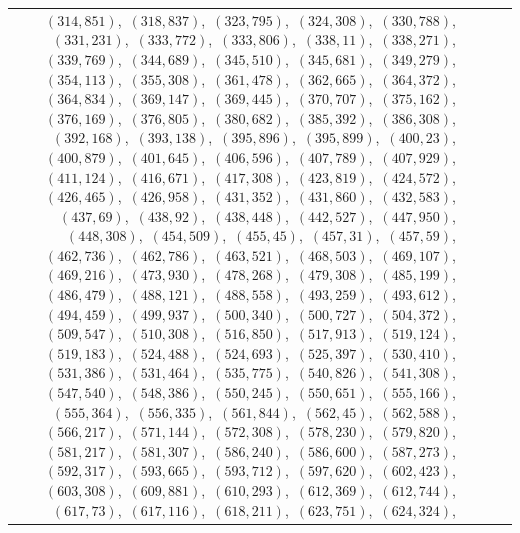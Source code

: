 \documentclass[11pt]{article}
\begin{document}
\begin{longtable}{@{}rrl>{\raggedright\arraybackslash}p{}@{}}
$(314,851)$,\allowbreak\ $(318,837)$,\allowbreak\ $(323,795)$,\allowbreak\ $(324,308)$,\allowbreak\ $(330,788)$,\allowbreak\ $(331,231)$,\allowbreak\ $(333,772)$,\allowbreak\ $(333,806)$,\allowbreak\ $(338,11)$,\allowbreak\ $(338,271)$,\allowbreak\ $(339,769)$,\allowbreak\ $(344,689)$,\allowbreak\ $(345,510)$,\allowbreak\ $(345,681)$,\allowbreak\ $(349,279)$,\allowbreak\ $(354,113)$,\allowbreak\ $(355,308)$,\allowbreak\ $(361,478)$,\allowbreak\ $(362,665)$,\allowbreak\ $(364,372)$,\allowbreak\ $(364,834)$,\allowbreak\ $(369,147)$,\allowbreak\ $(369,445)$,\allowbreak\ $(370,707)$,\allowbreak\ $(375,162)$,\allowbreak\ $(376,169)$,\allowbreak\ $(376,805)$,\allowbreak\ $(380,682)$,\allowbreak\ $(385,392)$,\allowbreak\ $(386,308)$,\allowbreak\ $(392,168)$,\allowbreak\ $(393,138)$,\allowbreak\ $(395,896)$,\allowbreak\ $(395,899)$,\allowbreak\ $(400,23)$,\allowbreak\ $(400,879)$,\allowbreak\ $(401,645)$,\allowbreak\ $(406,596)$,\allowbreak\ $(407,789)$,\allowbreak\ $(407,929)$,\allowbreak\ $(411,124)$,\allowbreak\ $(416,671)$,\allowbreak\ $(417,308)$,\allowbreak\ $(423,819)$,\allowbreak\ $(424,572)$,\allowbreak\ $(426,465)$,\allowbreak\ $(426,958)$,\allowbreak\ $(431,352)$,\allowbreak\ $(431,860)$,\allowbreak\ $(432,583)$,\allowbreak\ $(437,69)$,\allowbreak\ $(438,92)$,\allowbreak\ $(438,448)$,\allowbreak\ $(442,527)$,\allowbreak\ $(447,950)$,\allowbreak\ $(448,308)$,\allowbreak\ $(454,509)$,\allowbreak\ $(455,45)$,\allowbreak\ $(457,31)$,\allowbreak\ $(457,59)$,\allowbreak\ $(462,736)$,\allowbreak\ $(462,786)$,\allowbreak\ $(463,521)$,\allowbreak\ $(468,503)$,\allowbreak\ $(469,107)$,\allowbreak\ $(469,216)$,\allowbreak\ $(473,930)$,\allowbreak\ $(478,268)$,\allowbreak\ $(479,308)$,\allowbreak\ $(485,199)$,\allowbreak\ $(486,479)$,\allowbreak\ $(488,121)$,\allowbreak\ $(488,558)$,\allowbreak\ $(493,259)$,\allowbreak\ $(493,612)$,\allowbreak\ $(494,459)$,\allowbreak\ $(499,937)$,\allowbreak\ $(500,340)$,\allowbreak\ $(500,727)$,\allowbreak\ $(504,372)$,\allowbreak\ $(509,547)$,\allowbreak\ $(510,308)$,\allowbreak\ $(516,850)$,\allowbreak\ $(517,913)$,\allowbreak\ $(519,124)$,\allowbreak\ $(519,183)$,\allowbreak\ $(524,488)$,\allowbreak\ $(524,693)$,\allowbreak\ $(525,397)$,\allowbreak\ $(530,410)$,\allowbreak\ $(531,386)$,\allowbreak\ $(531,464)$,\allowbreak\ $(535,775)$,\allowbreak\ $(540,826)$,\allowbreak\ $(541,308)$,\allowbreak\ $(547,540)$,\allowbreak\ $(548,386)$,\allowbreak\ $(550,245)$,\allowbreak\ $(550,651)$,\allowbreak\ $(555,166)$,\allowbreak\ $(555,364)$,\allowbreak\ $(556,335)$,\allowbreak\ $(561,844)$,\allowbreak\ $(562,45)$,\allowbreak\ $(562,588)$,\allowbreak\ $(566,217)$,\allowbreak\ $(571,144)$,\allowbreak\ $(572,308)$,\allowbreak\ $(578,230)$,\allowbreak\ $(579,820)$,\allowbreak\ $(581,217)$,\allowbreak\ $(581,307)$,\allowbreak\ $(586,240)$,\allowbreak\ $(586,600)$,\allowbreak\ $(587,273)$,\allowbreak\ $(592,317)$,\allowbreak\ $(593,665)$,\allowbreak\ $(593,712)$,\allowbreak\ $(597,620)$,\allowbreak\ $(602,423)$,\allowbreak\ $(603,308)$,\allowbreak\ $(609,881)$,\allowbreak\ $(610,293)$,\allowbreak\ $(612,369)$,\allowbreak\ $(612,744)$,\allowbreak\ $(617,73)$,\allowbreak\ $(617,116)$,\allowbreak\ $(618,211)$,\allowbreak\ $(623,751)$,\allowbreak\ $(624,324)$,\allowbreak\ 
\end{longtable}
\end{document}

